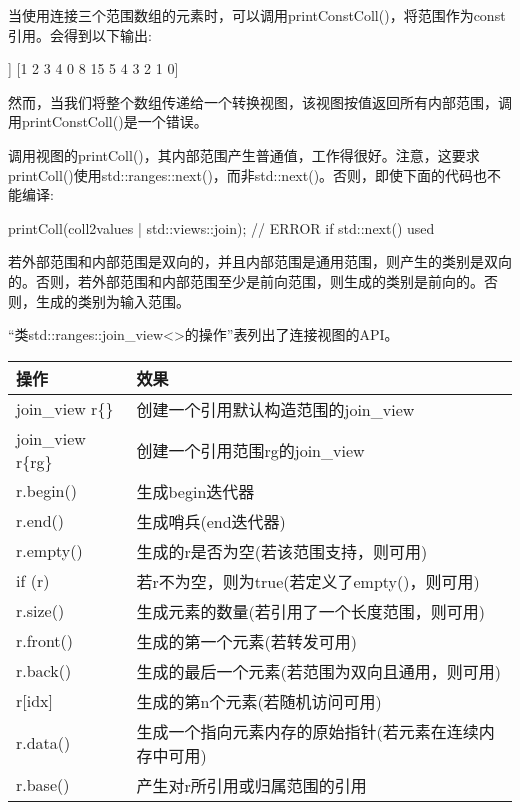 当使用连接三个范围数组的元素时，可以调用printConstColl()，将范围作为const引用。会得到以下输出:

\begin{shell}
[[1 2 3 4] [0 8 15] [5 4 3 2 1 0]]
[1 2 3 4 0 8 15 5 4 3 2 1 0]
\end{shell}

然而，当我们将整个数组传递给一个转换视图，该视图按值返回所有内部范围，调用printConstColl()是一个错误。

调用视图的printColl()，其内部范围产生普通值，工作得很好。注意，这要求printColl()使用std::ranges::next()，而非std::next()。否则，即使下面的代码也不能编译:

\begin{cpp}
printColl(coll2values | std::views::join); // ERROR if std::next() used
\end{cpp}


若外部范围和内部范围是双向的，并且内部范围是通用范围，则产生的类别是双向的。否则，若外部范围和内部范围至少是前向范围，则生成的类别是前向的。否则，生成的类别为输入范围。


“类std::ranges::join\_view<>的操作”表列出了连接视图的API。

\begin{longtable}[c]{|l|l|}
\hline
\textbf{操作} & \textbf{效果}                                                        \\ \hline
\endfirsthead
%
\endhead
%
join\_view r\{\}   & 创建一个引用默认构造范围的join\_view        \\ \hline
join\_view r\{rg\} & 创建一个引用范围rg的join\_view                           \\ \hline
r.begin()          & 生成begin迭代器                                              \\ \hline
r.end()            & 生成哨兵(end迭代器)                                      \\ \hline
r.empty()          & 生成的r是否为空(若该范围支持，则可用)          \\ \hline
if (r)             & 若r不为空，则为true(若定义了empty()，则可用)                \\ \hline
r.size()           & 生成元素的数量(若引用了一个长度范围，则可用) \\ \hline
r.front()          & 生成的第一个元素(若转发可用)                      \\ \hline
r.back()           & 生成的最后一个元素(若范围为双向且通用，则可用)         \\ \hline
r{[}idx{]}         & 生成的第n个元素(若随机访问可用)                    \\ \hline
r.data() & 生成一个指向元素内存的原始指针(若元素在连续内存中可用) \\ \hline
r.base()           & 产生对r所引用或归属范围的引用               \\ \hline
\end{longtable}

